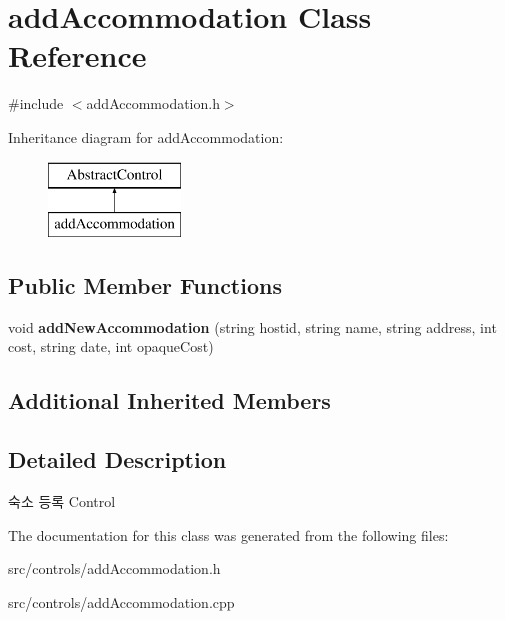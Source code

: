 \hypertarget{classadd_accommodation}{}\section{add\+Accommodation Class Reference}
\label{classadd_accommodation}


{\ttfamily \#include $<$add\+Accommodation.\+h$>$}

Inheritance diagram for add\+Accommodation\+:\begin{figure}[H]
\begin{center}
\leavevmode
\includegraphics[height=2.000000cm]{classadd_accommodation}
\end{center}
\end{figure}
\subsection*{Public Member Functions}
\begin{DoxyCompactItemize}
\item 
\mbox{\label{classadd_accommodation_a36fdd088c95c0af12d67bc678d346c78}} 
void {\bfseries add\+New\+Accommodation} (string hostid, string name, string address, int cost, string date, int opaque\+Cost)
\end{DoxyCompactItemize}
\subsection*{Additional Inherited Members}


\subsection{Detailed Description}
숙소 등록 Control 

The documentation for this class was generated from the following files\+:\begin{DoxyCompactItemize}
\item 
src/controls/add\+Accommodation.\+h\item 
src/controls/add\+Accommodation.\+cpp\end{DoxyCompactItemize}
